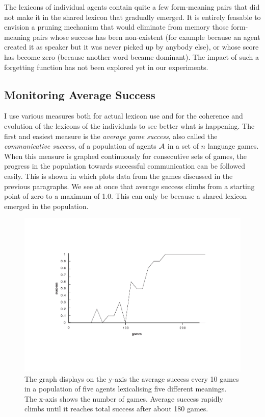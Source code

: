 The lexicons of individual agents contain quite a few form-meaning
pairs that did not make it in the shared lexicon that gradually 
emerged. It is entirely feasable to envision a pruning mechanism 
that would eliminate from memory those form-meaning pairs whose 
success has been non-existent (for example because an agent created
it as speaker but it was never picked up by anybody else), 
or whose score has become zero (because another word became
dominant). The impact of such a forgetting
function has not been explored yet in our experiments. 

\subsection{Monitoring Average Success} 

I use various measures both for actual lexicon use and for 
the coherence and evolution of the lexicons of
the individuals to see better what is happening. 
The first and easiest measure is the {\itshape average game success}, 
also called the {\itshape communicative success}, 
of a population of agents ${\cal A}$ in a set of $n$ language games. 
When this measure is graphed continuously for consecutive sets of 
games, the progress in the population
towards successful communication can be followed easily. This
is shown in  which plots data from the 
games discussed in the previous paragraphs. We see at once that
average success climbs from a starting point of zero
to a maximum of 1.0. This can only be because a shared lexicon 
emerged in the population. 
\begin{figure}[htbp]
  \centerline{\includegraphics[width=.70\textwidth]{chap5/figs/success}}
\caption{ \label{success} 
The graph displays on the y-axis the average success every 10 games
in a population of five agents lexicalising five
different meanings. The x-axis 
shows the number of games. Average success
rapidly climbs until it reaches total success after 
about 180 games.}
\end{figure}


